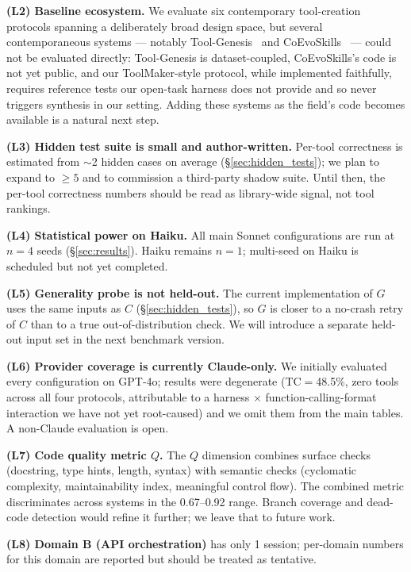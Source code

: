 \documentclass[sigplan,nonacm,natbib=false]{acmart}
\begin{document}
\noindent\textbf{(L2) Baseline ecosystem.} We evaluate six contemporary tool-creation protocols spanning a deliberately broad design space, but several contemporaneous systems --- notably Tool-Genesis~\cite{xia2026toolgenesis} and CoEvoSkills~\cite{zhang2026coevoskills} --- could not be evaluated directly: Tool-Genesis is dataset-coupled, CoEvoSkills's code is not yet public, and our ToolMaker-style protocol, while implemented faithfully, requires reference tests our open-task harness does not provide and so never triggers synthesis in our setting. Adding these systems as the field's code becomes available is a natural next step.

\noindent\textbf{(L3) Hidden test suite is small and author-written.} Per-tool correctness is estimated from $\sim$2 hidden cases on average (\S\ref{sec:hidden_tests}); we plan to expand to $\geq 5$ and to commission a third-party shadow suite. Until then, the per-tool correctness numbers should be read as library-wide signal, not tool rankings.

\noindent\textbf{(L4) Statistical power on Haiku.} All main Sonnet configurations are run at $n=4$ seeds (\S\ref{sec:results}). Haiku remains $n=1$; multi-seed on Haiku is scheduled but not yet completed.

\noindent\textbf{(L5) Generality probe is not held-out.} The current implementation of $G$ uses the same inputs as $C$ (\S\ref{sec:hidden_tests}), so $G$ is closer to a no-crash retry of $C$ than to a true out-of-distribution check. We will introduce a separate held-out input set in the next benchmark version.

\noindent\textbf{(L6) Provider coverage is currently Claude-only.} We initially evaluated every configuration on GPT-4o; results were degenerate (TC$=$48.5\%, zero tools across all four protocols, attributable to a harness$\,\times\,$function-calling-format interaction we have not yet root-caused) and we omit them from the main tables. A non-Claude evaluation is open.

\noindent\textbf{(L7) Code quality metric $Q$.} The $Q$ dimension combines surface checks (docstring, type hints, length, syntax) with semantic checks (cyclomatic complexity, maintainability index, meaningful control flow). The combined metric discriminates across systems in the 0.67--0.92 range. Branch coverage and dead-code detection would refine it further; we leave that to future work.

\noindent\textbf{(L8) Domain B (API orchestration)} has only 1 session; per-domain numbers for this domain are reported but should be treated as tentative.
\end{document}
